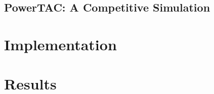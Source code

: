 

\section{\ac {PowerTAC}: A Competitive Simulation}


\chapter{Implementation}


\chapter{Results}


